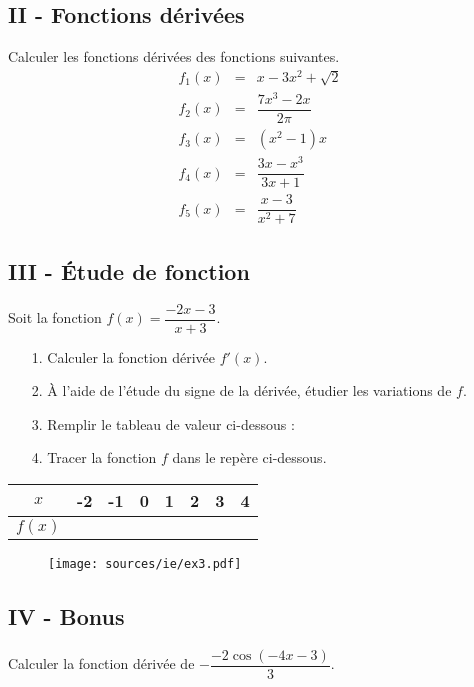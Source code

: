 \documentclass[12pt]{article}
\begin{document}
\begin{multicols}{2}

\subsection*{II - Fonctions dérivées}
Calculer les fonctions dérivées des fonctions suivantes.
\begin{eqnarray*}
  f_{1}(x) &=& x - 3x^{2} + \sqrt{2}\\
  f_{2}(x) &=& \dfrac{7x^{3} - 2x}{2\pi}\\
  f_{3}(x) &=& (x^{2} - 1)x\\
  f_{4}(x) &=& \dfrac{3x - x^{3}}{3x+1}\\
  f_{5}(x) &=& \dfrac{x - 3}{x^{2} + 7}
\end{eqnarray*}

\subsection*{III - Étude de fonction}
Soit la fonction $f(x) = \dfrac{-2x-3}{x+3}$.

\begin{enumerate}
\item[1.] Calculer la fonction dérivée $f'(x)$.
\item[2.] À l'aide de l'étude du signe de la dérivée, étudier les variations de $f$.
\item[3.] Remplir le tableau de valeur ci-dessous :
\item[4.] Tracer la fonction $f$ dans le repère ci-dessous.
\end{enumerate}
\end{multicols}

  \begin{center}
    \begin{tabular}{| c | c | c | c | c | c | c | c |}
      \hline
      $x$ & -2 & -1 & 0 & 1 & 2 & 3 & 4\\
      \hline
      $f(x)$  & \phantom{123456789} & \phantom{123456789} & \phantom{123456789} & \phantom{123456789} & \phantom{123456789} & \phantom{123456789} & \phantom{123456789} \\
      \hline
    \end{tabular}
  \end{center}


  \begin{figure}[H]
    \centering
    \texttt{[image: sources/ie/ex3.pdf]}
  \end{figure}


\subsection*{IV - Bonus}

Calculer la fonction dérivée de $-\dfrac{-2\cos(-4x - 3)}{3}$.
\end{document}
